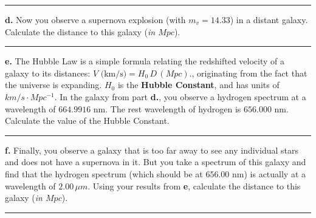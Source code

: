 \documentclass[
]{article}
\begin{document}
\begin{center}\rule{0.5\linewidth}{0.5pt}\end{center}

\textbf{d.} Now you observe a supernova explosion (with
{\(m_{v} = 14.33\)}) in a distant galaxy. Calculate the distance to this
galaxy (\emph{in {\(Mpc\)}}).

\begin{center}\rule{0.5\linewidth}{0.5pt}\end{center}

\textbf{e.} The Hubble Law is a simple formula relating the redshifted
velocity of a galaxy to its distances:
{\(V\text{~(km/s)} = H_{0}\, D\,(Mpc).\)}, originating from the fact
that the universe is expanding. {\(H_{0}\)} is the \textbf{Hubble
Constant}, and has units of {\(km/s \cdot Mpc^{- 1}\)}. In the galaxy
from part \textbf{d.}, you observe a hydrogen spectrum at a wavelength
of {\(664.9916\text{~nm}\)}. The rest wavelength of hydrogen is
{\(656.000\text{~nm}.\)} Calculate the value of the Hubble Constant.

\begin{center}\rule{0.5\linewidth}{0.5pt}\end{center}

\textbf{f.} Finally, you observe a galaxy that is too far away to see
any individual stars and does not have a supernova in it. But you take a
spectrum of this galaxy and find that the hydrogen spectrum (which
should be at {\(656.00\text{~nm}\)}) is actually at a wavelength of
{\(2.00\,\mu m\)}. Using your results from \textbf{e}, calculate the
distance to this galaxy (\emph{in {\(Mpc\)}}).

\begin{center}\rule{0.5\linewidth}{0.5pt}\end{center}
\end{document}
